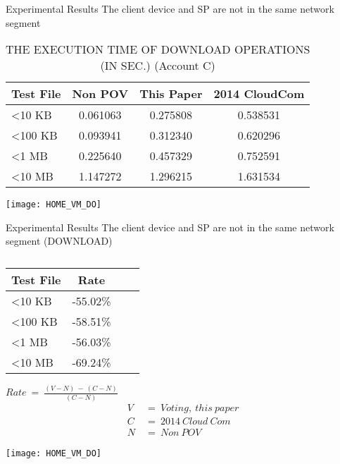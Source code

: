\begin{frame}{Experimental Results}
{The client device and SP are \alert{not} in the same network segment}
	\scriptsize
    \begin{table}[]
    \centering
    \caption{THE EXECUTION TIME OF \alert{DOWNLOAD} OPERATIONS (IN SEC.) (Account C)}
    \begin{tabular}{lccc}
        Test File        & Non POV  & This Paper & 2014 CloudCom \\ \hline
        \textless 10 KB  & 0.061063 & 0.275808   & 0.538531      \\ \hline
        \textless 100 KB & 0.093941 & 0.312340   & 0.620296      \\ \hline
        \textless 1 MB   & 0.225640 & 0.457329   & 0.752591      \\ \hline
        \textless 10 MB  & 1.147272 & 1.296215   & 1.631534      \\ \hline
    \end{tabular}
    \end{table}
    \begin{center}
	    \texttt{[image: HOME\_VM\_DO]}
    \end{center}
\end{frame}

\begin{frame}{Experimental Results}
{The client device and SP are \alert{not} in the same network segment (DOWNLOAD)}
	\begin{minipage}[c]{0.4\textwidth}
	\scriptsize
    \begin{table}[] 
    \centering
    \caption{}
    \begin{tabular}{lccc}
        Test File        & Rate     \\ \hline
        \textless 10 KB  & -55.02\% \\ \hline
        \textless 100 KB & -58.51\% \\ \hline
        \textless 1 MB   & -56.03\% \\ \hline
        \textless 10 MB  & -69.24\% \\ \hline
    \end{tabular}
    \end{table}
    \begin{center}
		$Rate\ =\ \frac{(V-N)\ -\ (C-N)}{(C-N)}$
        \begin{equation*} \label{eq6}
                \begin{split}
                        V\ & =\ Voting,\ this\ paper\\
                        C\ & =\ 2014\ Cloud\ Com\\
                        N\ & =\ Non\ POV
                \end{split}
        \end{equation*}
    \end{center}
    \end{minipage}%
    \begin{minipage}[c]{0.6\textwidth}
	\texttt{[image: HOME\_VM\_DO]}
    \end{minipage}
\end{frame}

